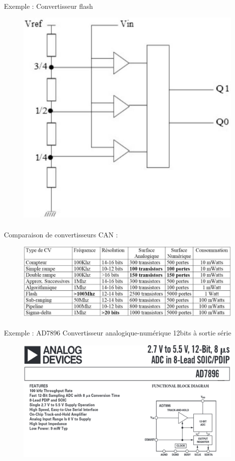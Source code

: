 \documentclass{article}
\begin{document}
\paragraph{}
Exemple : Convertisseur flash
\begin{figure}[H]
    \centering
    \includegraphics[width=.5\linewidth]{images/convertisseur-flash.png}
\end{figure}

\newpage
\paragraph{}
Comparaison de convertisseurs CAN :
\begin{figure}[H]
    \centering
    \includegraphics[width=\linewidth]{images/CAN-comp.png}
\end{figure}

\paragraph{}
Exemple : AD7896 Convertisseur analogique-numérique 12bits à sortie série

\begin{figure}[H]
    \centering
    \includegraphics[width=0.9\linewidth]{images/AD7896.png}
\end{figure}
\end{document}
